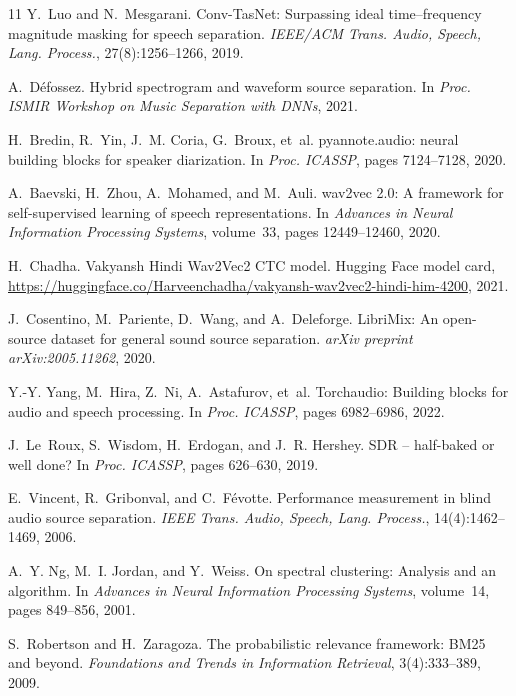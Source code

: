 \documentclass[11pt,a4paper,twocolumn]{article}
\begin{document}
\begin{thebibliography}{11}
\small
{}
Y.~Luo and N.~Mesgarani.
\newblock Conv-TasNet: Surpassing ideal time--frequency magnitude masking for speech separation.
\newblock \emph{IEEE/ACM Trans. Audio, Speech, Lang. Process.}, 27(8):1256--1266, 2019.

A.~D{\'e}fossez.
\newblock Hybrid spectrogram and waveform source separation.
\newblock In \emph{Proc. ISMIR Workshop on Music Separation with DNNs}, 2021.

H.~Bredin, R.~Yin, J.~M. Coria, G.~Broux, et~al.
\newblock pyannote.audio: neural building blocks for speaker diarization.
\newblock In \emph{Proc. ICASSP}, pages 7124--7128, 2020.

A.~Baevski, H.~Zhou, A.~Mohamed, and M.~Auli.
\newblock wav2vec 2.0: A framework for self-supervised learning of speech representations.
\newblock In \emph{Advances in Neural Information Processing Systems}, volume~33, pages 12449--12460, 2020.

H.~Chadha.
\newblock Vakyansh Hindi Wav2Vec2 CTC model.
\newblock Hugging Face model card, \url{https://huggingface.co/Harveenchadha/vakyansh-wav2vec2-hindi-him-4200}, 2021.

J.~Cosentino, M.~Pariente, D.~Wang, and A.~Deleforge.
\newblock LibriMix: An open-source dataset for general sound source separation.
\newblock \emph{arXiv preprint arXiv:2005.11262}, 2020.

Y.-Y. Yang, M.~Hira, Z.~Ni, A.~Astafurov, et~al.
\newblock Torchaudio: Building blocks for audio and speech processing.
\newblock In \emph{Proc. ICASSP}, pages 6982--6986, 2022.

J.~Le~Roux, S.~Wisdom, H.~Erdogan, and J.~R. Hershey.
\newblock SDR -- half-baked or well done?
\newblock In \emph{Proc. ICASSP}, pages 626--630, 2019.

E.~Vincent, R.~Gribonval, and C.~F{\'e}votte.
\newblock Performance measurement in blind audio source separation.
\newblock \emph{IEEE Trans. Audio, Speech, Lang. Process.}, 14(4):1462--1469, 2006.

A.~Y. Ng, M.~I. Jordan, and Y.~Weiss.
\newblock On spectral clustering: Analysis and an algorithm.
\newblock In \emph{Advances in Neural Information Processing Systems}, volume~14, pages 849--856, 2001.

S.~Robertson and H.~Zaragoza.
\newblock The probabilistic relevance framework: BM25 and beyond.
\newblock \emph{Foundations and Trends in Information Retrieval}, 3(4):333--389, 2009.
\end{thebibliography}
\end{document}
